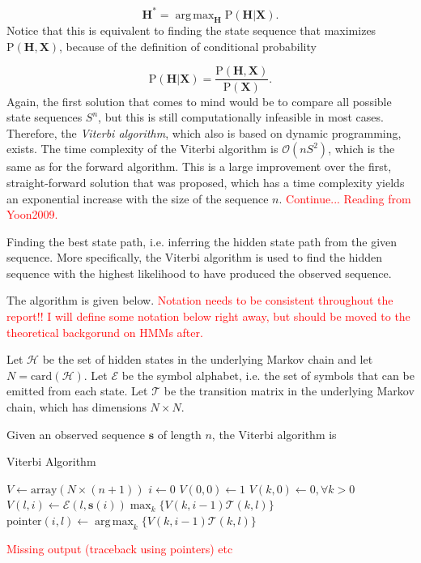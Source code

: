 \documentclass{article}
\DeclareMathOperator*{\argmax}{arg\,max}
\begin{document}
\begin{equation}
    \mathbf{H^*} = \argmax_\mathbf{H} \text{P}(\mathbf{H}|\mathbf{X}).
    \label{optimalStatePath}
\end{equation}
Notice that this is equivalent to finding the state sequence that maximizes $\text{P}(\mathbf{H}, \mathbf{X})$, because of the definition of conditional probability  

\begin{equation*}
    \text{P}(\mathbf{H}|\mathbf{X}) = \frac{\text{P}(\mathbf{H}, \mathbf{X})}{\text{P}(\mathbf{X})}.
\end{equation*}
Again, the first solution that comes to mind would be to compare all possible state sequences $S^n$, but this is still computationally infeasible in most cases. Therefore, the \textit{Viterbi algorithm}, which also is based on dynamic programming, exists. The time complexity of the Viterbi algorithm is $\mathcal{O}(nS^2)$, which is the same as for the forward algorithm. This is a large improvement over the first, straight-forward solution that was proposed, which has a time complexity yields an exponential increase with the size of the sequence $n$. \textcolor{red}{Continue... Reading from Yoon2009.}

Finding the best state path, i.e. inferring the hidden state path from the given sequence. More specifically, the Viterbi algorithm is used to find the hidden sequence with the highest likelihood to have produced the observed sequence. 

The algorithm is given below. \textcolor{red}{Notation needs to be consistent throughout the report!! I will define some notation below right away, but should be moved to the theoretical backgorund on HMMs after.}

Let $\mathcal{H}$ be the set of hidden states in the underlying Markov chain and let $N = \text{card}(\mathcal{H})$. Let $\mathcal{E}$ be the symbol alphabet, i.e. the set of symbols that can be emitted from each state. Let $\mathcal{T}$ be the transition matrix in the underlying Markov chain, which has dimensions $N \times N$.

Given an observed sequence $\mathbf{s}$ of length $n$, the Viterbi algorithm is 

\begin{algorithm}
\caption{Viterbi Algorithm}\label{alg:Viterbi}
\begin{algorithmic}
    \STATE $V \gets \text{array}(N \times (n+1))$
    \STATE $i \gets 0$
    \STATE $V(0,0) \gets 1$
    \STATE $V(k,0) \gets 0, \forall k > 0$
        \STATE $V(l,i) \gets \mathcal{E}(l, \mathbf{s}(i))\max_k\{V(k, i-1)\mathcal{T}(k,l)\}$
        \STATE $\text{pointer}(i,l) \gets \argmax_k\{V(k, i-1)\mathcal{T}(k,l)\}$
    \ENDFOR
\end{algorithmic} 
\end{algorithm}
\textcolor{red}{Missing output (traceback using pointers) etc}
\end{document}
